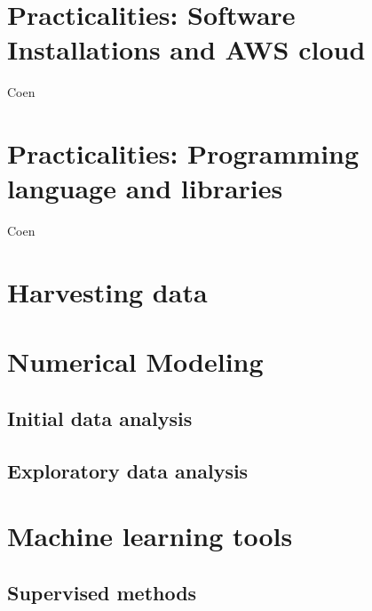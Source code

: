 \documentclass[10pt]{PhDthesisPSnPDF}%
\begin{document}
\newpage
\chapter{Practicalities: Software Installations and AWS cloud}\label{P1}
Coen
\cleardoublepage

\newpage
\chapter{Practicalities: Programming language and libraries}\label{P2}
Coen
\cleardoublepage

\newpage
\chapter{Harvesting data}\label{harvesting}

\cleardoublepage

\chapter{Numerical Modeling}\label{numerics}

\section{Initial data analysis}\label{numBasics}


\section{Exploratory data analysis}\label{NumDesign}




\chapter{Machine learning tools}\label{MLearn}

\section{Supervised methods}
\end{document}
